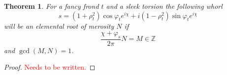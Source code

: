 \documentclass{article}
\newcommand{\red}[1]{\textcolor{red}{#1}}
\theoremstyle{plain}
\newtheorem{theorem}{Theorem}[section]
\theoremstyle{definition}
\begin{document}
    \begin{theorem}
        For a fancy frond $t$ and a sleek torsion
        the following whorl
        $$
            s = (1+\rho_t^2)\cos\varphi_t e^{i\chi} + i(1-\rho_t^2)\sin\varphi_t e^{i\chi}
        $$ will be an elemental root of merosity $N$ if $$
            \frac{\chi+\varphi_s}{2\pi}N= M\in \mathbb Z
        $$ and $  \gcd(M,N)=1$.
    \end{theorem}
    \begin{proof}
        \red{Needs to be written.}
    \end{proof}
\end{document}
